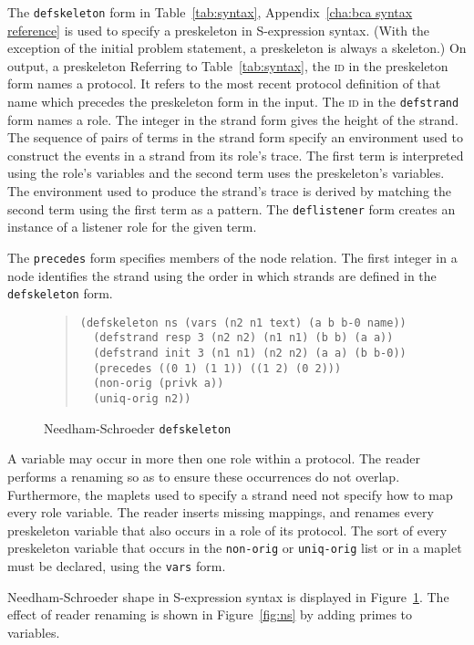 \documentclass[12pt]{report}
\theoremstyle{definition}
\begin{document}
The \texttt{defskeleton} form in Table~\ref{tab:syntax},
Appendix~\ref{cha:bca syntax reference} is used to specify a
preskeleton in S-expression syntax.  (With the exception of the
initial problem statement, a preskeleton is always a skeleton.)
On output, a preskeleton Referring to
Table~\ref{tab:syntax}, the \textsc{id} in the preskeleton form names
a protocol.  It refers to the most recent protocol definition of that
name which precedes the preskeleton form in the input.  The
\textsc{id} in the \texttt{defstrand} form names a role.  The integer
in the strand form gives the height of the strand.  The sequence of
pairs of terms in the strand form specify an environment used to
construct the events in a strand from its role's trace.  The
first term is interpreted using the role's variables and the second
term uses the preskeleton's variables.  The environment used to
produce the strand's trace is derived by matching the second term
using the first term as a pattern.  The \texttt{deflistener} form
creates an instance of a listener role for the given term.

The \texttt{precedes} form specifies members of the node relation.
The first integer in a node identifies the strand using the order in
which strands are defined in the \texttt{defskeleton} form.

\begin{figure}
\begin{quote}
\begin{verbatim}
(defskeleton ns (vars (n2 n1 text) (a b b-0 name))
  (defstrand resp 3 (n2 n2) (n1 n1) (b b) (a a))
  (defstrand init 3 (n1 n1) (n2 n2) (a a) (b b-0))
  (precedes ((0 1) (1 1)) ((1 2) (0 2)))
  (non-orig (privk a))
  (uniq-orig n2))
\end{verbatim}
\end{quote}
\caption{Needham-Schroeder \texttt{defskeleton}}\label{fig:defns}
\end{figure}

A variable may occur in more then one role within a protocol.  The
reader performs a renaming so as to ensure these occurrences do not
overlap.  Furthermore, the maplets used to specify a strand need not
specify how to map every role variable.  The reader inserts missing
mappings, and renames every preskeleton variable that also occurs in a
role of its protocol.  The sort of every preskeleton variable that
occurs in the \texttt{non-orig} or \texttt{uniq-orig} list or in a
maplet must be declared, using the \texttt{vars} form.

Needham-Schroeder shape in S-expression syntax is displayed in
Figure~\ref{fig:defns}.  The effect of reader renaming is shown in
Figure~\ref{fig:ns} by adding primes to variables.
\end{document}
